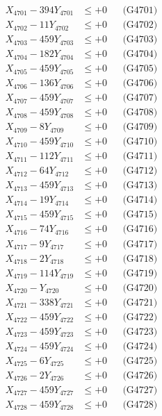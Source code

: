 \documentclass[a4paper,10pt]{article}
\begin{document}
{\begin{align}
\allowbreak
X_{4701} - 394Y_{4701} &\leq +0 && \text{(G4701)} \\
X_{4702} - 11Y_{4702} &\leq +0 && \text{(G4702)} \\
X_{4703} - 459Y_{4703} &\leq +0 && \text{(G4703)} \\
X_{4704} - 182Y_{4704} &\leq +0 && \text{(G4704)} \\
X_{4705} - 459Y_{4705} &\leq +0 && \text{(G4705)} \\
X_{4706} - 136Y_{4706} &\leq +0 && \text{(G4706)} \\
X_{4707} - 459Y_{4707} &\leq +0 && \text{(G4707)} \\
X_{4708} - 459Y_{4708} &\leq +0 && \text{(G4708)} \\
X_{4709} - 8Y_{4709} &\leq +0 && \text{(G4709)} \\
X_{4710} - 459Y_{4710} &\leq +0 && \text{(G4710)} \\
\allowbreak
X_{4711} - 112Y_{4711} &\leq +0 && \text{(G4711)} \\
X_{4712} - 64Y_{4712} &\leq +0 && \text{(G4712)} \\
X_{4713} - 459Y_{4713} &\leq +0 && \text{(G4713)} \\
X_{4714} - 19Y_{4714} &\leq +0 && \text{(G4714)} \\
X_{4715} - 459Y_{4715} &\leq +0 && \text{(G4715)} \\
X_{4716} - 74Y_{4716} &\leq +0 && \text{(G4716)} \\
X_{4717} - 9Y_{4717} &\leq +0 && \text{(G4717)} \\
X_{4718} - 2Y_{4718} &\leq +0 && \text{(G4718)} \\
X_{4719} - 114Y_{4719} &\leq +0 && \text{(G4719)} \\
X_{4720} - Y_{4720} &\leq +0 && \text{(G4720)} \\
\allowbreak
X_{4721} - 338Y_{4721} &\leq +0 && \text{(G4721)} \\
X_{4722} - 459Y_{4722} &\leq +0 && \text{(G4722)} \\
X_{4723} - 459Y_{4723} &\leq +0 && \text{(G4723)} \\
X_{4724} - 459Y_{4724} &\leq +0 && \text{(G4724)} \\
X_{4725} - 6Y_{4725} &\leq +0 && \text{(G4725)} \\
X_{4726} - 2Y_{4726} &\leq +0 && \text{(G4726)} \\
X_{4727} - 459Y_{4727} &\leq +0 && \text{(G4727)} \\
X_{4728} - 459Y_{4728} &\leq +0 && \text{(G4728)} \\

\end{align}}
\end{document}
